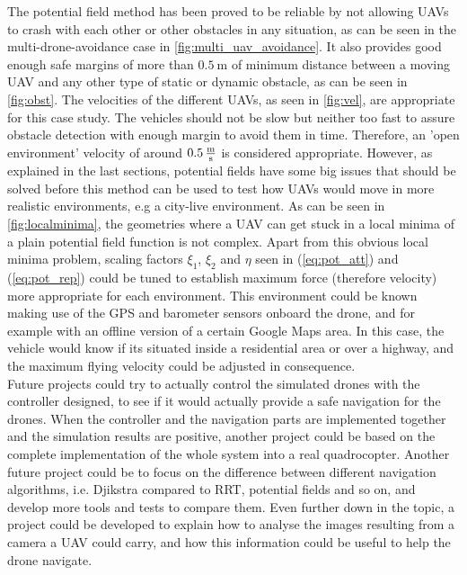 \documentclass[journal]{IEEEtran}
\newcommand*{\subb}[1]{_{\mathrm{#1}}}
\begin{document}
	The potential field method has been proved to be reliable by not allowing UAVs to crash with each other or other obstacles in any situation, as can be seen in the multi-drone-avoidance case in \figurename{\ref{fig:multi_uav_avoidance}}. It also provides good enough safe margins of more than $\SI{0.5}{\meter}$ of minimum distance between a moving UAV and any other type of static or dynamic obstacle, as can be seen in \figurename{\ref{fig:obst}}. The velocities of the different UAVs, as seen in \figurename{\ref{fig:vel}}, are appropriate for this case study. The vehicles should not be slow but neither too fast to assure obstacle detection with enough margin to avoid them in time. Therefore, an 'open environment' velocity of around $\SI{0.5}{\frac{\meter}{\second}}$ is considered appropriate. However, as explained in the last sections, potential fields have some big issues that should be solved before this method can be used to test how UAVs would move in more realistic environments, e.g a city-live environment. As can be seen in \figurename{\ref{fig:localminima}}, the geometries where a UAV can get stuck in a local minima of a plain potential field function is not complex. Apart from this obvious local minima problem, scaling factors $\xi\subb{1}$, $\xi\subb{2}$ and $\eta$ seen in (\ref{eq:pot_att}) and (\ref{eq:pot_rep}) could be tuned to establish maximum force (therefore velocity) more appropriate for each environment. This environment could be known making use of the GPS and barometer sensors onboard the drone, and for example with an offline version of a certain Google Maps area. In this case, the vehicle would know if its situated inside a residential area or over a highway, and the maximum flying velocity could be adjusted in consequence.\\

	Future projects could try to actually control the simulated drones with the controller designed, to see if it would actually provide a safe navigation for the drones. When the controller and the navigation parts are implemented together and the simulation results are positive, another project could be based on the complete implementation of the whole system into a real quadrocopter. Another future project could be to focus on the difference between different navigation algorithms, i.e. Djikstra compared to RRT, potential fields and so on, and develop more tools and tests to compare them. Even further down in the topic, a project could be developed to explain how to analyse the images resulting from a camera a UAV could carry, and how this information could be useful to help the drone navigate.\\
	
\end{document}
